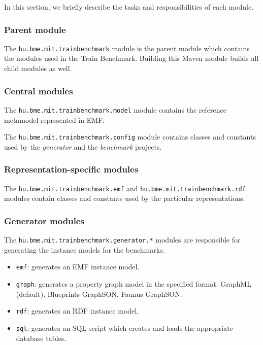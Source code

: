 In this section, we briefly describe the tasks and responsibilities of each module.

\subsubsection{Parent module}

The \texttt{hu.bme.mit.trainbenchmark} module is the parent module which contains the modules used in the Train Benchmark. Building this Maven module builds all child modules as well.

\subsubsection{Central modules}

The \texttt{hu.bme.mit.trainbenchmark.model} module contains the reference metamodel represented in EMF.

The \texttt{hu.bme.mit.trainbenchmark.config} module contains classes and constants used by the \emph{generator} and the \emph{benchmark} projects.



\subsubsection{Representation-specific modules}

The \texttt{hu.bme.mit.trainbenchmark.emf} and \texttt{hu.bme.mit.trainbenchmark.rdf} modules contain classes and constants used by the particular representations.



\subsubsection{Generator modules}

The \texttt{hu.bme.mit.trainbenchmark.generator.*} modules are responsible for generating the instance models for the benchmarks.

\begin{itemize}
  \item \texttt{emf}: generates an EMF instance model.
  \item \texttt{graph}: generates a property graph model in the specified format: GraphML (default), Blueprints GraphSON, Faunus GraphSON.
  \item \texttt{rdf}: generates an RDF instance model.
  \item \texttt{sql}: generates an SQL script which creates and loads the appropriate database tables.
\end{itemize}



